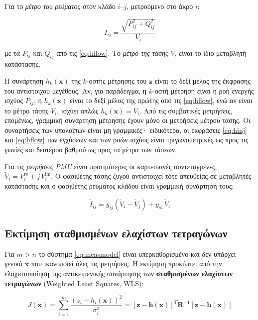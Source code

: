 Για το \emph{μέτρο του ρεύματος} στον κλάδο $i$--$j$, μετρούμενο στο άκρο $i$:

\begin{equation}
I_{ij} = \frac{\sqrt{P_{ij}^2 + Q_{ij}^2}}{V_i}
\label{eq:hcur}
\end{equation}

με τα $P_{ij}$ και $Q_{ij}$ από τις \eqref{eq:hflow}. Το \emph{μέτρο της τάσης} $V_i$ είναι το
ίδιο μεταβλητή κατάστασης.

Η συνάρτηση $h_k(\mathbf{x})$ της $k$-οστής μέτρησης του $\mathbf{z}$ είναι το δεξί μέλος της
έκφρασης του αντίστοιχου μεγέθους. Αν, για παράδειγμα, η $k$-οστή μέτρηση είναι η ροή ενεργής
ισχύος $P_{ij}$, η $h_k(\mathbf{x})$ είναι το δεξί μέλος της πρώτης από τις \eqref{eq:hflow},
ενώ αν είναι το μέτρο τάσης $V_i$, ισχύει απλώς $h_k(\mathbf{x}) = V_i$. Από τις συμβατικές
μετρήσεις, επομένως, γραμμική συνάρτηση μέτρησης έχουν μόνο οι μετρήσεις μέτρου τάσης. Οι
συναρτήσεις των υπολοίπων είναι μη γραμμικές· ειδικότερα, οι εκφράσεις \eqref{eq:hinj} και \eqref{eq:hflow} των
εγχύσεων και των ροών ισχύος είναι τριγωνομετρικές ως προς τις γωνίες και δευτέρου βαθμού ως
προς τα μέτρα των τάσεων.

Για τις \emph{μετρήσεις PMU} είναι προτιμότερες οι καρτεσιανές συντεταγμένες,
$\tilde{V}_i = V_i^{\mathrm{re}} + j\,V_i^{\mathrm{im}}$. Ο φασιθέτης τάσης ζυγού αντιστοιχεί τότε απευθείας σε μεταβλητές
κατάστασης και ο φασιθέτης ρεύματος κλάδου είναι γραμμική συνάρτησή τους:

\begin{equation}
\tilde{I}_{ij} = y_{ij}\left(\tilde{V}_i - \tilde{V}_j\right) + y_{si}\,\tilde{V}_i
\label{eq:hpmu}
\end{equation}

\subsection{Εκτίμηση σταθμισμένων ελαχίστων τετραγώνων}
\label{sec:wls}

Για $m > n$ το σύστημα \eqref{eq:measmodel} είναι υπερκαθορισμένο και δεν υπάρχει γενικά
$\mathbf{x}$ που ικανοποιεί όλες τις μετρήσεις. Η εκτίμηση προκύπτει από την ελαχιστοποίηση της
αντικειμενικής συνάρτησης των \textbf{σταθμισμένων ελαχίστων τετραγώνων} (Weighted Least
Squares, WLS):

\begin{equation}
J(\mathbf{x}) = \sum_{i=1}^{m} \frac{\left(z_i - h_i(\mathbf{x})\right)^2}{\sigma_i^2}
             = \left[\mathbf{z}-\mathbf{h}(\mathbf{x})\right]^{T} \mathbf{R}^{-1}
               \left[\mathbf{z}-\mathbf{h}(\mathbf{x})\right]
\label{eq:wls}
\end{equation}

